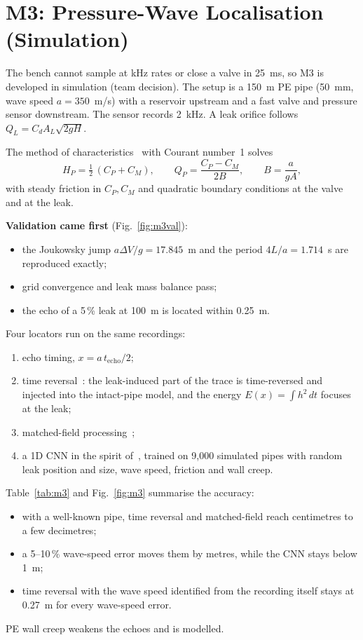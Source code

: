 \documentclass[conference]{IEEEtran}
\begin{document}
\section{M3: Pressure-Wave Localisation (Simulation)}
\label{sec:m3}
The bench cannot sample at kHz rates or close a valve in 25~ms, so M3 is developed in simulation
(team decision). The setup is a 150~m PE pipe (50~mm, wave speed $a = 350$~m/s) with a reservoir
upstream and a fast valve and pressure sensor downstream. The sensor records 2~kHz. A leak
orifice follows $Q_L = C_d A_L \sqrt{2gH}$.

The method of characteristics~\cite{wylie1993,chaudhry2014} with Courant number~1 solves
\begin{equation}
H_P = \tfrac12\,(C_P + C_M),\qquad Q_P = \frac{C_P - C_M}{2B},\qquad B = \frac{a}{gA},
\end{equation}
with steady friction in $C_P, C_M$ and quadratic boundary conditions at the valve and at the leak.

\textbf{Validation came first} (Fig.~\ref{fig:m3val}):
\begin{itemize}
\item the Joukowsky jump $a\Delta V/g = 17.845$~m and the period $4L/a = 1.714$~s are reproduced
  exactly;
\item grid convergence and leak mass balance pass;
\item the echo of a 5\,\% leak at 100~m is located within 0.25~m.
\end{itemize}

Four locators run on the same recordings:
\begin{enumerate}
\item echo timing, $x = a\,t_{\mathrm{echo}}/2$;
\item time reversal~\cite{waqar2023}: the leak-induced part of the trace is time-reversed and
  injected into the intact-pipe model, and the energy $E(x) = \int h^2\,dt$ focuses at the leak;
\item matched-field processing~\cite{wang2020};
\item a 1D CNN in the spirit of~\cite{waqar2025}, trained on 9,000 simulated pipes with random
  leak position and size, wave speed, friction and wall creep.
\end{enumerate}
Table~\ref{tab:m3} and Fig.~\ref{fig:m3} summarise the accuracy:
\begin{itemize}
\item with a well-known pipe, time reversal and matched-field reach centimetres to a few
  decimetres;
\item a 5--10\,\% wave-speed error moves them by metres, while the CNN stays below 1~m;
\item time reversal with the wave speed identified from the recording itself stays at 0.27~m
  for every wave-speed error.
\end{itemize}
PE wall creep weakens the echoes and is modelled.
\end{document}

